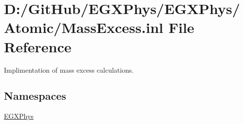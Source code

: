 \hypertarget{_mass_excess_8inl}{}\section{D\+:/\+Git\+Hub/\+E\+G\+X\+Phys/\+E\+G\+X\+Phys/\+Atomic/\+Mass\+Excess.inl File Reference}
\label{_mass_excess_8inl}


Implimentation of mass excess calculations.  


\subsection*{Namespaces}
\begin{DoxyCompactItemize}
\item 
 \mbox{\hyperlink{namespace_e_g_x_phys}{E\+G\+X\+Phys}}
\end{DoxyCompactItemize}

